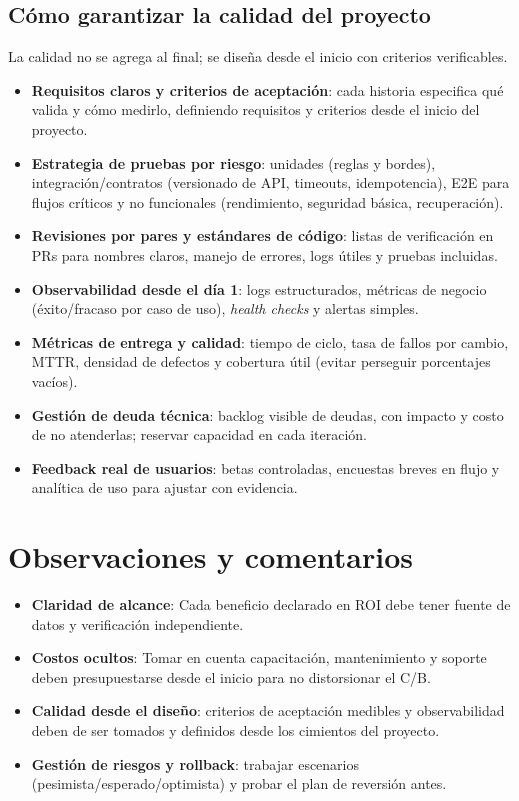 \documentclass[12pt]{article}
\begin{document}
\subsection{Cómo garantizar la calidad del proyecto}
La calidad no se agrega al final; se diseña desde el inicio con criterios verificables.
\begin{itemize}[leftmargin=2em]
  \item \textbf{Requisitos claros y criterios de aceptación}: cada historia especifica qué valida y cómo medirlo, definiendo requisitos y criterios desde el inicio del proyecto.
  \item \textbf{Estrategia de pruebas por riesgo}: unidades (reglas y bordes), integración/contratos (versionado de API, timeouts, idempotencia), E2E para flujos críticos y no funcionales (rendimiento, seguridad básica, recuperación).
  \item \textbf{Revisiones por pares y estándares de código}: listas de verificación en PRs para nombres claros, manejo de errores, logs útiles y pruebas incluidas.
  \item \textbf{Observabilidad desde el día 1}: logs estructurados, métricas de negocio (éxito/fracaso por caso de uso), \textit{health checks} y alertas simples.
  \item \textbf{Métricas de entrega y calidad}: tiempo de ciclo, tasa de fallos por cambio, MTTR, densidad de defectos y cobertura útil (evitar perseguir porcentajes vacíos).
  \item \textbf{Gestión de deuda técnica}: backlog visible de deudas, con impacto y costo de no atenderlas; reservar capacidad en cada iteración.
  \item \textbf{Feedback real de usuarios}: betas controladas, encuestas breves en flujo y analítica de uso para ajustar con evidencia.
\end{itemize}

\section{Observaciones y comentarios}
\begin{itemize}[leftmargin=2em]
  \item \textbf{Claridad de alcance}: Cada beneficio declarado en ROI debe tener fuente de datos y verificación independiente.
  \item \textbf{Costos ocultos}: Tomar en cuenta capacitación, mantenimiento y soporte deben presupuestarse desde el inicio para no distorsionar el C/B.
  \item \textbf{Calidad desde el diseño}: criterios de aceptación medibles y observabilidad deben de ser tomados y definidos desde los cimientos del proyecto.
  \item \textbf{Gestión de riesgos y rollback}: trabajar escenarios (pesimista/esperado/optimista) y probar el plan de reversión antes.
\end{itemize}
\end{document}
